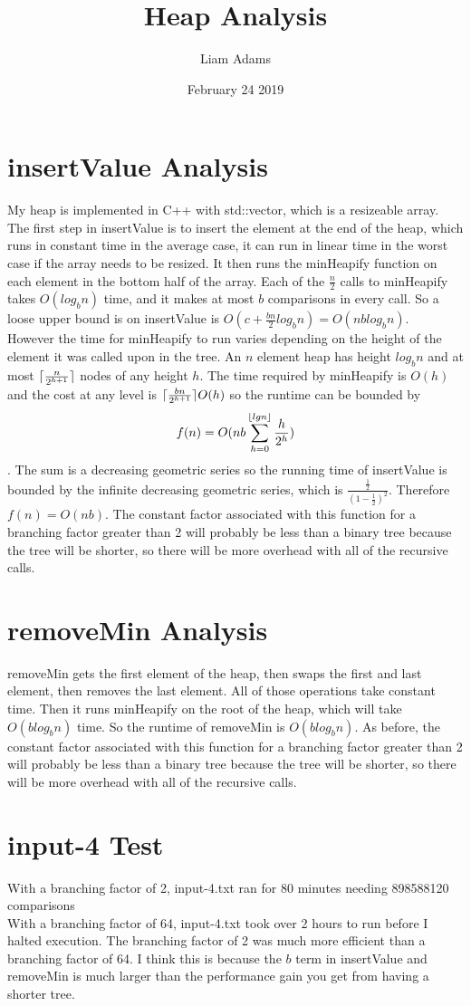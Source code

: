 \documentclass{article}
\title{Heap Analysis}
\author{Liam Adams}
\date{February 24 2019}
\DeclarePairedDelimiter{\ceil}{\lceil}{\rceil}
\DeclarePairedDelimiter{\floor}{\lfloor}{\rfloor}
\begin{document}
\maketitle

\section*{insertValue Analysis}
My heap is implemented in C++ with std::vector, which is a resizeable array.  The first step in insertValue is to insert the element at the end of the heap, which runs in constant time in the average case, it can run in linear time in the worst case if the array needs to be resized.  It then runs the minHeapify function on each element in the bottom half of the array.  Each of the $\frac{n}{2}$ calls to minHeapify takes $O(log_bn)$ time, and it makes at most $b$ comparisons in every call.  So a loose upper bound is on insertValue is $O(c+\frac{bn}{2}log_bn)=O(nblog_bn)$.\\
However the time for minHeapify to run varies depending on the height of the element it was called upon in the tree.  An $n$ element heap has height $log_bn$ and at most $\ceil{\frac{n}{2^{h+1}}}$ nodes of any height $h$.  The time required by minHeapify is $O(h)$ and the cost at any level is $\ceil{\frac{bn}{2^{h+1}}}O(h)$ so the runtime can be bounded by $$f(n)=O(nb\sum_{h=0}^{\floor{lgn}}\frac{h}{2^h})$$. The sum is a decreasing geometric series so the running time of insertValue is bounded by the infinite decreasing geometric series, which is $\frac{\frac{1}{2}}{(1-\frac{1}{2})^2}$. Therefore $f(n)=O(nb)$.  The constant factor associated with this function for a branching factor greater than 2 will probably be less than a binary tree because the tree will be shorter, so there will be more overhead with all of the recursive calls.
\section*{removeMin Analysis}
removeMin gets the first element of the heap, then swaps the first and last element, then removes the last element. All of those operations take constant time. Then it runs minHeapify on the root of the heap, which will take $O(blog_bn)$ time. So the runtime of removeMin is $O(blog_bn)$. As before, the constant factor associated with this function for a branching factor greater than 2 will probably be less than a binary tree because the tree will be shorter, so there will be more overhead with all of the recursive calls.
\section*{input-4 Test}
With a branching factor of 2, input-4.txt ran for 80 minutes needing 898588120 comparisons\\
With a branching factor of 64, input-4.txt took over 2 hours to run before I halted execution.  The branching factor of 2 was much more efficient than a branching factor of 64.  I think this is because the $b$ term in insertValue and removeMin is much larger than the performance gain you get from having a shorter tree. 
\end{document}

